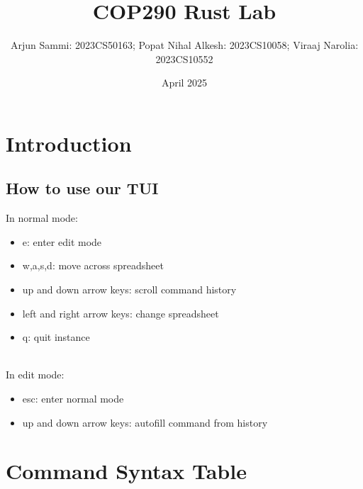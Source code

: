 \documentclass{article}
\title{COP290 Rust Lab}
\author{Arjun Sammi: 2023CS50163; Popat Nihal Alkesh: 2023CS10058; Viraaj Narolia: 2023CS10552}
\date{April 2025}
\begin{document}
\maketitle
\section{Introduction}
\subsection{How to use our TUI}
In normal mode:

\begin{itemize}
    \item e: enter edit mode
    \item w,a,s,d: move across spreadsheet
    \item up and down arrow keys: scroll command history
    \item left and right arrow keys: change spreadsheet
    \item q: quit instance
\end{itemize} \\
In edit mode:
\begin{itemize}
    \item esc: enter normal mode
    \item up and down arrow keys: autofill command from history
\end{itemize}

\section{Command Syntax Table}
\end{document}
